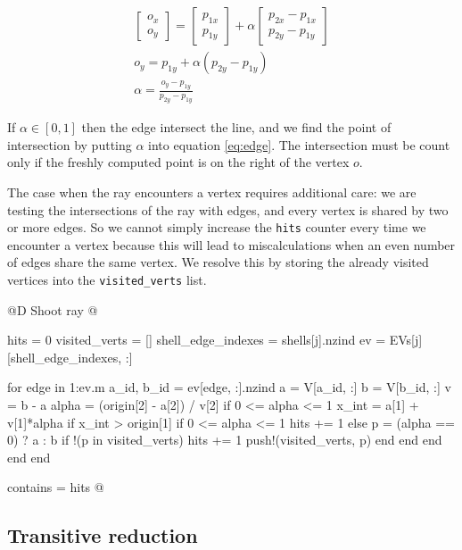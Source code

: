\begin{gather*}
    \begin{bmatrix}
        o_x \\ o_y
    \end{bmatrix}
    = 
    \begin{bmatrix}
        p_{1x} \\ p_{1y}
    \end{bmatrix}
    +
    \alpha
    \begin{bmatrix}
        p_{2x} - p_{1x} \\ p_{2y} - p_{1y}
    \end{bmatrix} \\
    o_y = p_{1y} + \alpha(p_{2y} - p_{1y}) \\
    \alpha = \frac{o_y - p_{1y}}{p_{2y} - p_{1y}}
\end{gather*}

If $\alpha\in[0, 1]$ then the edge intersect the line, and we find the point
of intersection by putting $\alpha$ into equation \ref{eq:edge}.
The intersection must be count only if the freshly computed point
is on the right of the vertex $o$.

The case when the ray encounters a vertex requires additional care:
we are testing the intersections of the ray with edges, and every
vertex is shared by two or more edges. So we cannot simply increase the 
\texttt{hits} counter every time we encounter a vertex because this will lead
to miscalculations when an even number of edges share the same vertex.
We resolve this by storing the already visited vertices into the 
\texttt{visited\_verts} list.

@D Shoot ray
@{hits = 0
visited_verts = []
shell_edge_indexes = shells[j].nzind
ev = EVs[j][shell_edge_indexes, :]

for edge in 1:ev.m
    a_id, b_id = ev[edge, :].nzind
    a = V[a_id, :]
    b = V[b_id, :]
    v = b - a
    alpha = (origin[2] - a[2]) / v[2]
    if 0 <= alpha <= 1
        x_int = a[1] + v[1]*alpha
        if x_int > origin[1]
            if 0 <= alpha <= 1
                hits += 1
            else
                p = (alpha == 0) ? a : b
                if !(p in visited_verts)
                    hits += 1
                    push!(visited_verts, p)
                end
            end
        end
    end
end

contains = hits %
@}


\subsection{Transitive reduction}

